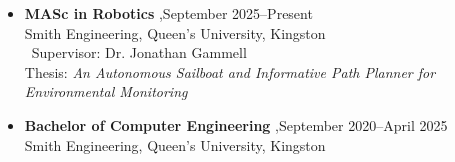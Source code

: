 \documentclass[letterpaper,10pt]{article}
\begin{document}



\begin{itemize}

\item
  \textbf{MASc in Robotics} \sep September 2025--Present\\
  Smith Engineering, Queen's University, Kingston\\\
  Supervisor: Dr. Jonathan Gammell\\
  Thesis: \textit{An Autonomous Sailboat and Informative Path Planner for Environmental Monitoring}

\item
  \textbf{Bachelor of Computer Engineering} \sep September 2020--April 2025\\
  Smith Engineering, Queen's University, Kingston
\end{itemize}


\end{document}
